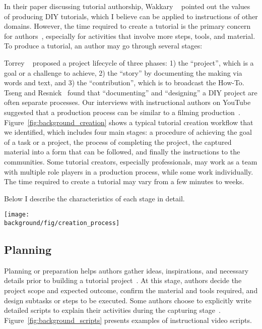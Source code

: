 In their paper discussing tutorial authorship, Wakkary \ea{}~\cite{Wakkary:2015:TAH:2702123.2702550} pointed out the values of producing DIY tutorials, which I believe can be applied to instructions of other domains. However, the time required to create a tutorial is the primary concern for authors~\cite{Kuznetsov:2010:REA:1868914.1868950}, especially for activities that involve more steps, tools, and material. To produce a tutorial, an author may go through several stages:

Torrey \ea{}~\cite{Torrey:2007he} proposed a project lifecycle of three phases: 1) the ``project'', which is a goal or a challenge to achieve, 2) the ``story'' by documenting the making via words and text, and 3) the ``contribution'', which is to broadcast the How-To.
%
Tseng and Resnick~\cite{Tseng:2014:PVP:2598510.2598540} found that ``documenting'' and ``designing'' a DIY project are often separate processes.
%
Our interviews with instructional authors on YouTube suggested that a production process can be similar to a filming production~\cite{Chi:2013:DGC:2501988.2502052}.
%
Figure~\ref{fig:background_creation} shows a typical tutorial creation workflow that we identified, which includes four main stages:  a procedure of achieving the goal of a task or a project,  the process of completing the project,  the captured material into a form that can be followed, and finally  the instructions to the communities.
%
Some tutorial creators, especially professionals, may work as a team with multiple role players in a production process, while some work individually. The time required to create a tutorial may vary from a few minutes to weeks.

Below I describe the characteristics of each stage in detail.

\begin{figure*}[h!]
  \centering
  \texttt{[image: \\background/fig/creation\_process]}
  \caption{A common workflow of tutorial creation, which includes planning the task in detail, capturing the process, editing the captured material into a readable form, and sharing with the communities.}
  \label{fig:background_creation}
\end{figure*}


\subsection{Planning}
Planning or preparation helps authors gather ideas, inspirations, and necessary details prior to building a tutorial project~\cite{Torrey:2007he}. At this stage, authors decide the project scope and expected outcome, confirm the material and tools required, and design subtasks or steps to be executed. Some authors choose to explicitly write detailed scripts to explain their activities during the capturing stage~\cite{Chi:2013:DGC:2501988.2502052}. Figure~\ref{fig:background_scripts} presents examples of instructional video scripts.

